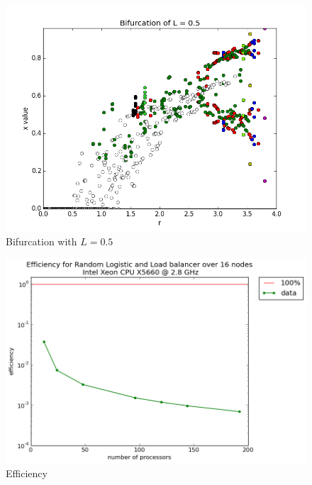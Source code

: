 \documentclass[12pt]{article}
\begin{document}
\begin{figure}[H]
	\begin{center}
		\includegraphics[scale=0.5]{Bifurcation_L5}
\caption{Bifurcation with $L=0.5$}
	\end{center}
\end{figure}
\begin{figure}[H]
	\begin{center}
		\includegraphics[scale=0.5]{efficiency_random_logistic}
\caption{Efficiency}
	\end{center}
\end{figure}
\end{document}
